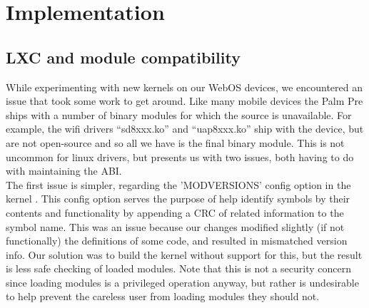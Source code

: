 \section{Implementation}
\label{sec:impl}

\subsection{LXC and module compatibility}

While experimenting with new kernels on our WebOS devices, we encountered an issue that took some work to get around.  Like many mobile devices the Palm Pre ships with a number of binary modules for which the source is unavailable.  For example, the wifi drivers ``sd8xxx.ko'' and ``uap8xxx.ko'' ship with the device, but are not open-source and so all we have is the final binary module.  This is not uncommon for linux drivers, but presents us with two issues, both having to do with maintaining the ABI. \\

    The first issue is simpler, regarding the 'MODVERSIONS' config option in the kernel \cite{modversions}.  This config option serves the purpose of help identify symbols by their contents and functionality by appending a CRC of related information to the symbol name.  This was an issue because our changes modified slightly (if not functionally) the definitions of some code, and resulted in mismatched version info.  Our solution was to build the kernel without support for this, but the result is less safe checking of loaded modules.  Note that this is not a security concern since loading modules is a privileged operation anyway, but rather is undesirable to help prevent the careless user from loading modules they should not. \\

